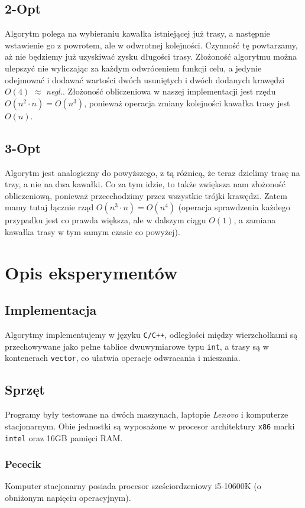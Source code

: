 \documentclass{article}
\begin{document}
\subsection{2-Opt}
Algorytm polega na wybieraniu kawałka istniejącej już trasy, a następnie wstawienie go z powrotem, ale w odwrotnej kolejności. Czynność tę powtarzamy, aż nie będziemy już uzyskiwać zysku długości trasy. Złożoność algorytmu można ulepszyć nie wyliczając za każdym odwróceniem funkcji celu, a jedynie odejmować i dodawać wartości dwóch usuniętych i dwóch dodanych krawędzi $O(4)$ $\approx$ \textit{negl.}. Złożoność obliczeniowa w naszej implementacji jest rzędu $O(n^2\cdot n) = O(n^3)$, ponieważ operacja zmiany kolejności kawałka trasy jest $O(n)$.

\subsection{3-Opt}
Algorytm jest analogiczny do powyższego, z tą różnicą, że teraz dzielimy trasę na trzy, a nie na dwa kawałki. Co za tym idzie, to także zwiększa nam złożoność obliczeniową, ponieważ przecchodzimy przez wszystkie trójki krawędzi. Zatem mamy tutaj łącznie rząd $O(n^3\cdot n) = O(n^4)$ (operacja sprawdzenia każdego przypadku jest co prawda większa, ale w dalszym ciągu $O(1)$, a zamiana kawałka trasy w tym samym czasie co powyżej).

\section{Opis eksperymentów}
\subsection{Implementacja}
Algorytmy implementujemy w języku \texttt{C/C++}, odległości między wierzchołkami są przechowywane jako pełne tablice dwuwymiarowe typu \texttt{int}, a trasy są w kontenerach \texttt{vector}, co ułatwia operacje odwracania i mieszania.

\subsection{Sprzęt}
Programy były testowane na dwóch maszynach, laptopie \textit{Lenovo} i komputerze stacjonarnym. Obie jednostki są wyposażone w procesor architektury \texttt{x86} marki \texttt{intel} oraz 16GB pamięci RAM.

\subsubsection{Pececik}
Komputer stacjonarny posiada procesor sześciordzeniowy i5-10600K (o obniżonym napięciu operacyjnym).
\end{document}
